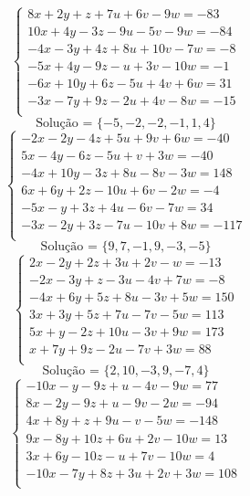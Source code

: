 \documentclass[12pt,oneside,a4paper]{article}
\begin{document}
\vspace{\baselineskip}
\begin{equation*}
\begin{cases}
8x+2y+z+7u+6v-9w=-83 \\
10x+4y-3z-9u-5v-9w=-84 \\
-4x-3y+4z+8u+10v-7w=-8 \\
-5x+4y-9z-u+3v-10w=-1 \\
-6x+10y+6z-5u+4v+6w=31 \\
-3x-7y+9z-2u+4v-8w=-15 \\
\end{cases}
\end{equation*}
\begin{equation*}
\text{Solução = }\{-5,-2,-2,-1,1,4\}
\end{equation*}
\vspace{\baselineskip}
\begin{equation*}
\begin{cases}
-2x-2y-4z+5u+9v+6w=-40 \\
5x-4y-6z-5u+v+3w=-40 \\
-4x+10y-3z+8u-8v-3w=148 \\
6x+6y+2z-10u+6v-2w=-4 \\
-5x-y+3z+4u-6v-7w=34 \\
-3x-2y+3z-7u-10v+8w=-117 \\
\end{cases}
\end{equation*}
\begin{equation*}
\text{Solução = }\{9,7,-1,9,-3,-5\}
\end{equation*}
\vspace{\baselineskip}
\begin{equation*}
\begin{cases}
2x-2y+2z+3u+2v-w=-13 \\
-2x-3y+z-3u-4v+7w=-8 \\
-4x+6y+5z+8u-3v+5w=150 \\
3x+3y+5z+7u-7v-5w=113 \\
5x+y-2z+10u-3v+9w=173 \\
x+7y+9z-2u-7v+3w=88 \\
\end{cases}
\end{equation*}
\begin{equation*}
\text{Solução = }\{2,10,-3,9,-7,4\}
\end{equation*}
\vspace{\baselineskip}
\begin{equation*}
\begin{cases}
-10x-y-9z+u-4v-9w=77 \\
8x-2y-9z+u-9v-2w=-94 \\
4x+8y+z+9u-v-5w=-148 \\
9x-8y+10z+6u+2v-10w=13 \\
3x+6y-10z-u+7v-10w=4 \\
-10x-7y+8z+3u+2v+3w=108 \\
\end{cases}
\end{equation*}
\end{document}
